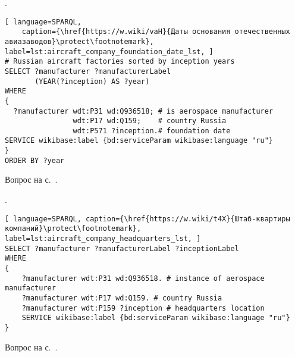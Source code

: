 \begin{task}
    \label{answer:aircraft_company_foundation_date}
    . 
    
	\begin{lstlisting}[ language=SPARQL, 
    caption={\href{https://w.wiki/vaH}{Даты основания отечественных авиазаводов}\protect\footnotemark}, label=lst:aircraft_company_foundation_date_lst, ]
# Russian aircraft factories sorted by inception years
SELECT ?manufacturer ?manufacturerLabel
       (YEAR(?inception) AS ?year)
WHERE
{
  ?manufacturer wdt:P31 wd:Q936518; # is aerospace manufacturer
                wdt:P17 wd:Q159;    # country Russia
                wdt:P571 ?inception.# foundation date
SERVICE wikibase:label {bd:serviceParam wikibase:language "ru"}
}
ORDER BY ?year
\end{lstlisting}
    
    \small{Вопрос на с.~\pageref{aircraft_question_2}.}
\end{task}

\begin{task}
    \label{answer:aircraft_company_headquarters}
    . 
    
	\begin{lstlisting}[ language=SPARQL, caption={\href{https://w.wiki/t4X}{Штаб-квартиры компаний}\protect\footnotemark}, label=lst:aircraft_company_headquarters_lst, ]
SELECT ?manufacturer ?manufacturerLabel ?inceptionLabel
WHERE
{
    ?manufacturer wdt:P31 wd:Q936518. # instance of aerospace manufacturer
  	?manufacturer wdt:P17 wd:Q159. # country Russia
  	?manufacturer wdt:P159 ?inception # headquarters location
    SERVICE wikibase:label {bd:serviceParam wikibase:language "ru"}
}
\end{lstlisting}
    
    \small{Вопрос на с.~\pageref{aircraft_question_3}.}
\end{task}

